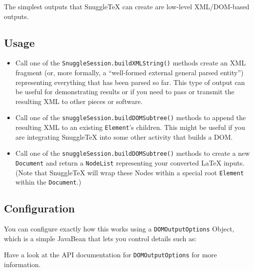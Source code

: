 
The simplest outputs that SnuggleTeX can create are low-level XML/DOM-based outputs.

\subsection*{Usage}

\begin{itemize}
  \item
    Call one of the \verb|SnuggleSession.buildXMLString()| methods create an XML fragment
    (or, more formally, a ``well-formed external general parsed entity'')
    representing everything that has been parsed so far.
    This type of output can be useful for demonstrating results or if you need to pass or
    transmit the resulting XML to other pieces or software.

  \item
    Call one of the \verb|snuggleSession.buildDOMSubtree()|
    methods to append the resulting XML to an existing \verb|Element|'s
    children.  This might be useful if you are integrating SnuggleTeX into some
    other activity that builds a DOM.

  \item
    Call one of the \verb|snuggleSession.buildDOMSubtree()|
    methods to create a new \verb|Document| and return a \verb|NodeList|
    representing your converted LaTeX inputs. (Note that SnuggleTeX will wrap
    these Nodes within a special root \verb|Element| within the
    \verb|Document|.)

\end{itemize}

\subsection*{Configuration}

You can configure exactly how this works using a \verb|DOMOutputOptions| Object,
which is a simple JavaBean that lets you control details such as:


Have a look at the API documentation for \verb|DOMOutputOptions| for more information.

